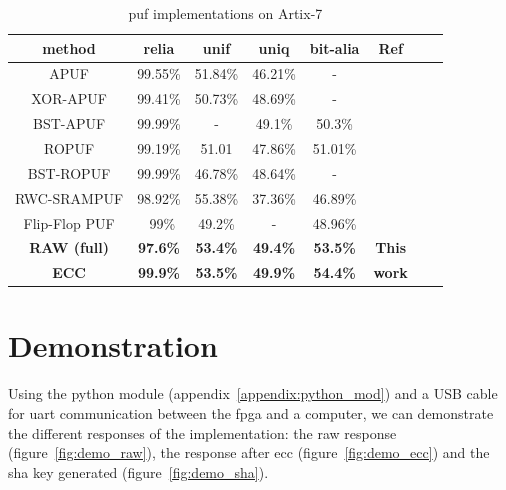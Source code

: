 \begin{table}[H]
    \centering
    \begin{tabular}{|c|c|c|c|c|c|c|c|}
         \hline
         \textbf{method} & \textbf{\acrshort{relia}} & \textbf{\acrshort{unif}} & \textbf{\acrshort{uniq}} & \textbf{\acrshort{bit-alia}} & \textbf{Ref}\\
         \hline\hline
         APUF & 99.55\% & 51.84\% & 46.21\% & -  & \cite{anandakumar_implementation_2022}\\
         \hline
         XOR-APUF & 99.41\% & 50.73\% & 48.69\% &  - & \cite{anandakumar_implementation_2022}\\
         \hline
         BST-APUF & 99.99\% & - & 49.1\% & 50.3\% & \cite{he_highly_2020}\\
         \hline
         ROPUF & 99.19\% & 51.01 & 47.86\% & 51.01\% & \cite{de_weerdt_implementation_2021}\\
         \hline
         BST-ROPUF & 99.99\% & 46.78\% & 48.64\% & - & \cite{he_highly_2021}\\
         \hline
         RWC-SRAMPUF & 98.92\% & 55.38\% & 37.36\% & 46.89\% & \cite{cicek_new_2022}\\
         \hline
         Flip-Flop PUF & ~99\% & 49.2\% & - & 48.96\% & \cite{khan_symmetric_2020}\\
         \hline\hline
         \textbf{RAW (full)} & \textbf{97.6\%} & \textbf{53.4\%} & \textbf{49.4\%} & \textbf{53.5\%} & \textbf{This}\\ 
         \textbf{ECC} & \textbf{99.9\%} & \textbf{53.5\%} & \textbf{49.9\%} & \textbf{54.4\%} & \textbf{work}\\
         \hline
    \end{tabular}
    \caption{\acrshort{puf} implementations on Artix-7}
    \label{tab:artix7_impl}
\end{table}

\newpage
\section{Demonstration}

Using the python module (appendix~\ref{appendix:python_mod}) and a USB cable for \acrshort{uart} communication between the \acrshort{fpga} and a computer, we can demonstrate the different responses of the implementation: the raw response (figure~\ref{fig:demo_raw}), the response after \acrshort{ecc} (figure~\ref{fig:demo_ecc}) and the \acrshort{sha} key generated (figure~\ref{fig:demo_sha}).

